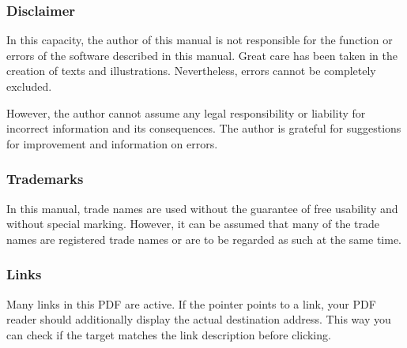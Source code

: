\subsubsection*{\sffamily{}Disclaimer}
\label{sec:Disclaimer}
%
%
In this capacity, the author of this manual is not responsible for
the function or errors of the software described in this
manual. Great care has been taken in the creation of texts and
illustrations. Nevertheless, errors cannot be completely
excluded.\par
However, the author cannot assume any legal responsibility or
liability for incorrect information and its consequences. The author
is grateful for suggestions for improvement and information on
errors.

\subsubsection*{\sffamily{}Trademarks}
\label{sec:Warenzeichen}
In this manual, trade names are used without the guarantee of free
usability and without special marking. However, it can be assumed
that many of the trade names are registered trade names or are to be
regarded as such at the same time.

\subsubsection*{\sffamily{}Links}
\label{sec:Link-liability}
Many links in this PDF are active. If the pointer points to a link,
your PDF reader should additionally display the actual destination
address. This way you can check if the target matches the link
description before clicking.
\endgroup %

